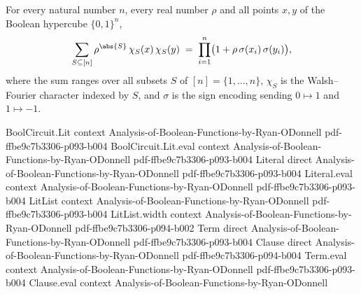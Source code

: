 \begin{lemma}
\leanok
{}
\label{BooleanAnalysis.Hypercontractivity.sum_fourier_kernel}
For every natural number $n$, every real number $\rho$ and all points $x, y$ of the
Boolean hypercube $\{0,1\}^n$,
\[
  \sum_{S \subseteq [n]} \rho^{\abs{S}}\,\chi_S(x)\,\chi_S(y)
  \;=\; \prod_{i=1}^{n} \bigl(1 + \rho\,\sigma(x_i)\,\sigma(y_i)\bigr),
\]
where the sum ranges over all subsets $S$ of $[n]=\{1,\dots,n\}$, $\chi_S$ is the
Walsh--Fourier character indexed by $S$, and $\sigma$ is the sign encoding sending
$0\mapsto 1$ and $1\mapsto -1$.
\end{lemma}

\begin{lemma}
\leanok
{}
\proofstep
  {BoolCircuit.Lit}
  {context}
  {Analysis-of-Boolean-Functions-by-Ryan-ODonnell}
  {pdf-ffbe9c7b3306-p093-b004}
\proofstep
  {BoolCircuit.Lit.eval}
  {context}
  {Analysis-of-Boolean-Functions-by-Ryan-ODonnell}
  {pdf-ffbe9c7b3306-p093-b004}
\proofstep
  {Literal}
  {direct}
  {Analysis-of-Boolean-Functions-by-Ryan-ODonnell}
  {pdf-ffbe9c7b3306-p093-b004}
\proofstep
  {Literal.eval}
  {context}
  {Analysis-of-Boolean-Functions-by-Ryan-ODonnell}
  {pdf-ffbe9c7b3306-p093-b004}
\proofstep
  {LitList}
  {context}
  {Analysis-of-Boolean-Functions-by-Ryan-ODonnell}
  {pdf-ffbe9c7b3306-p093-b004}
\proofstep
  {LitList.width}
  {context}
  {Analysis-of-Boolean-Functions-by-Ryan-ODonnell}
  {pdf-ffbe9c7b3306-p094-b002}
\proofstep
  {Term}
  {direct}
  {Analysis-of-Boolean-Functions-by-Ryan-ODonnell}
  {pdf-ffbe9c7b3306-p093-b004}
\proofstep
  {Clause}
  {direct}
  {Analysis-of-Boolean-Functions-by-Ryan-ODonnell}
  {pdf-ffbe9c7b3306-p094-b004}
\proofstep
  {Term.eval}
  {context}
  {Analysis-of-Boolean-Functions-by-Ryan-ODonnell}
  {pdf-ffbe9c7b3306-p093-b004}
\proofstep
  {Clause.eval}
  {context}
  {Analysis-of-Boolean-Functions-by-Ryan-ODonnell}

\end{lemma}
